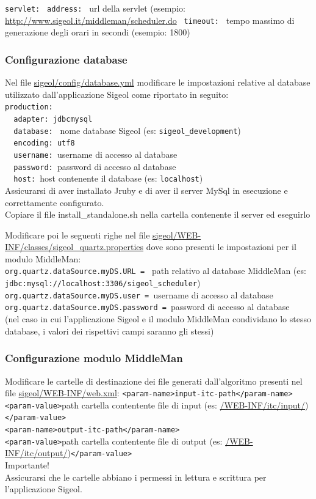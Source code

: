 \documentclass[11pt,a4paper]{article}
\begin{document}
\verb|servlet:|
\verb| address: | url della servlet (esempio: \url{http://www.sigeol.it/middleman/scheduler.do}
\verb| timeout: | tempo massimo di generazione degli orari in secondi (esempio: 1800)

\subsubsection{Configurazione database}
Nel file \url{sigeol/config/database.yml} modificare le impostazioni relative al database utilizzato dall'applicazione Sigeol come riportato in seguito:\\
\verb|production:| \\
\verb|  adapter: jdbcmysql |\\
\verb|  database: | nome database Sigeol (es: \verb|sigeol_development|)\\
\verb|  encoding: utf8 |\\
\verb|  username: |username di accesso al database\\
\verb|  password: |password di accesso al database\\
\verb|  host: |host contenente il database (es: \verb|localhost|)
\\
Assicurarsi di aver installato Jruby e di aver il server MySql in esecuzione e correttamente configurato.\\
Copiare il file install\_standalone.sh nella cartella contenente il server ed eseguirlo

Modificare poi le seguenti righe nel file \url{sigeol/WEB-INF/classes/sigeol_quartz.properties} dove sono presenti le impostazioni per il modulo MiddleMan:\\
\verb|org.quartz.dataSource.myDS.URL = | path relativo al database MiddleMan (es: \verb|jdbc:mysql://localhost:3306/sigeol_scheduler|)\\
\verb|org.quartz.dataSource.myDS.user = |username di accesso al database\\
\verb|org.quartz.dataSource.myDS.password = |password di accesso al database\\

(nel caso in cui l'applicazione Sigeol e il modulo MiddleMan condividano lo stesso database, i valori dei rispettivi campi saranno gli stessi)

\subsubsection{Configurazione modulo MiddleMan}
Modificare le cartelle di destinazione dei file generati dall'algoritmo presenti nel file \url{sigeol/WEB-INF/web.xml}:
\verb|<param-name>input-itc-path</param-name>|\\
\verb|<param-value>|path cartella contentente file di input (es: \url{/WEB-INF/itc/input/})\verb|</param-value>|\\
\verb|<param-name>output-itc-path</param-name>|\\
\verb|<param-value>|path cartella contentente file di output (es: \url{/WEB-INF/itc/output/})\verb|</param-value>|\\
Importante!\\
Assicurarsi che le cartelle abbiano i permessi in lettura e scrittura per l'applicazione Sigeol.
\end{document}
